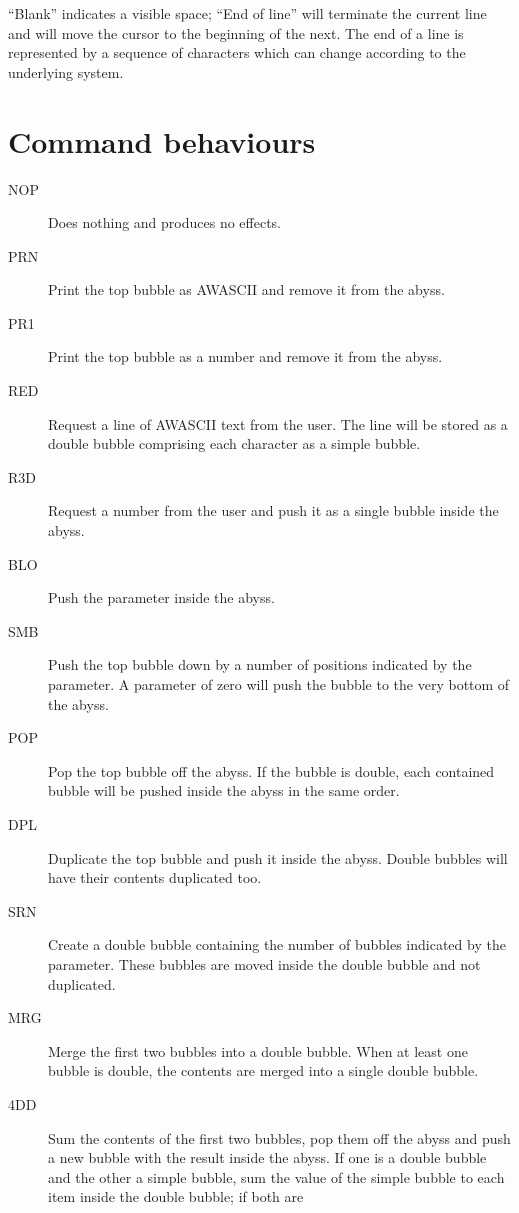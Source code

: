 \documentclass[11pt,a4paper,draft]{book}
\begin{document}
\textsuperscript{\dag}\enquote{Blank} indicates a visible space; \enquote{End of line} will
terminate the current line and will move the cursor to the beginning
of the next. The end of a line is represented by a sequence of
characters which can change according to the underlying system.

\section{Command behaviours}
\label{command-behaviours}
\begin{description}
\item[NOP] Does nothing and produces no effects.
\item[PRN] Print the top bubble as AWASCII and remove it from the abyss.
\item[PR1] Print the top bubble as a number and remove it from the abyss.
\item[RED] Request a line of AWASCII text from the user. The line will
  be stored as a double bubble comprising each character as a simple
  bubble.
\item[R3D] Request a number from the user and push it as a single
  bubble inside the abyss.
\item[BLO] Push the parameter inside the abyss.
\item[SMB] Push the top bubble down by a number of positions indicated
  by the parameter. A parameter of zero will push the bubble to the
  very bottom of the abyss.
\item[POP] Pop the top bubble off the abyss. If the bubble is double,
  each contained bubble will be pushed inside the abyss in the same
  order.
\item[DPL] Duplicate the top bubble and push it inside the
  abyss. Double bubbles will have their contents duplicated too.
\item[SRN] Create a double bubble containing the number of bubbles
  indicated by the parameter. These bubbles are moved inside the
  double bubble and not duplicated.
\item[MRG] Merge the first two bubbles into a double bubble. When at
  least one bubble is double, the contents are merged into a single
  double bubble.
\item[4DD] Sum the contents of the first two bubbles, pop them off the
  abyss and push a new bubble with the result inside the abyss. If one
  is a double bubble and the other a simple bubble, sum the value of
  the simple bubble to each item inside the double bubble; if both are

\end{description}
\end{document}

